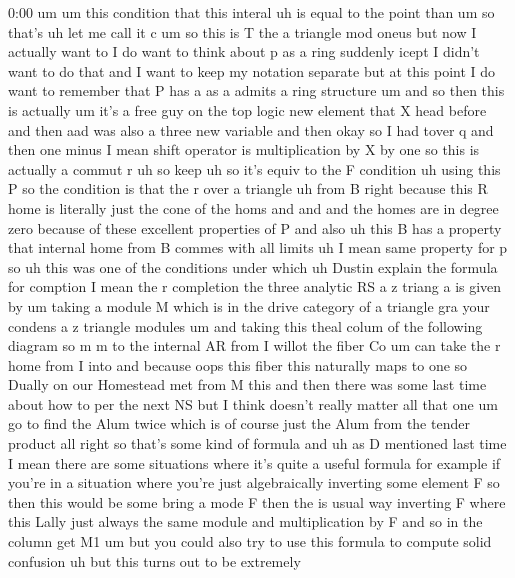 \begin{unfinished}{0:00}
um
um  this  condition  that  this
interal  uh  is  equal  to  the  point  than
um  so
that's  uh  let  me  call  it  c  um  so  this  is
T  the  a
triangle  mod
oneus  but  now  I  actually  want  to  I  do
want  to  think  about  p  as  a  ring  suddenly
icept  I  didn't  want  to  do  that  and  I
want  to  keep  my  notation
separate  but  at  this  point  I  do  want  to
remember  that  P  has  a  as  a  admits  a  ring
structure
um  and  so  then  this  is
actually
um  it's  a  free  guy  on  the  top  logic  new
element  that  X  head  before  and  then  aad
was  also  a  three  new  variable
and  then  okay  so  I  had  tover
q  and  then  one  minus  I  mean  shift
operator  is  multiplication  by
X  by
one  so  this  is  actually  a  commut
r  uh  so
keep  uh  so  it's  equiv  to  the  F  condition
uh  using  this  P  so  the  condition  is  that
the
r  over  a
triangle  uh  from
B  right  because  this  R  home  is  literally
just  the  cone  of  the  homs  and  and  and
the  homes  are  in  degree  zero  because  of
these  excellent  properties  of
P
and  also  uh  this  B  has  a  property  that
internal  home  from  B  commes  with  all
limits  uh  I  mean  same  property  for
p
so  uh  this  was  one  of  the  conditions
under  which  uh  Dustin  explain  the
formula  for
comption  I  mean  the  r
completion  the  three  analytic
RS
a  z  triang
a  is  given
by  um  taking  a  module  M  which  is  in  the
drive  category  of  a
triangle  gra  your  condens  a  z  triangle
modules  um  and  taking
this  theal
colum  of  the  following
diagram
so  m  m  to  the  internal
AR
from  I
willot  the
fiber
Co
um  can  take  the  r  home  from  I
into  and  because  oops  this  fiber  this
naturally  maps  to  one  so  Dually  on  our
Homestead  met  from  M  this  and  then  there
was  some  last  time  about  how  to  per  the
next  NS  but  I  think  doesn't  really
matter  all  that  one  um
go  to  find  the  Alum  twice  which  is  of
course  just  the  Alum  from  the  tender
product  all  right  so  that's  some  kind  of
formula  and  uh  as  D  mentioned  last  time
I  mean  there  are  some  situations  where
it's  quite  a  useful  formula  for  example
if  you're  in  a  situation  where  you're
just  algebraically  inverting  some
element  F  so  then  this  would  be  some
bring  a  mode  F  then  the  is  usual  way
inverting  F  where  this  Lally  just  always
the  same  module  and  multiplication  by  F
and  so  in  the  column  get
M1
um  but  you  could  also  try  to  use  this
formula  to  compute  solid  confusion  uh
but  this  turns  out  to  be  extremely

\end{unfinished}
